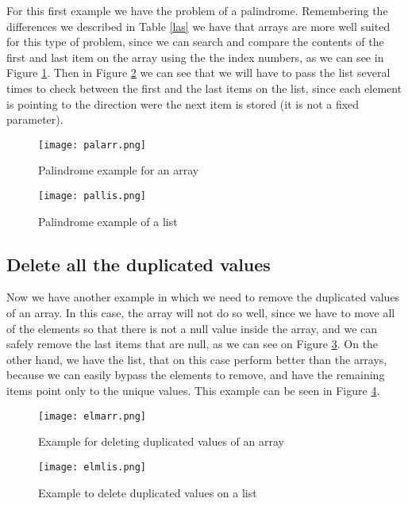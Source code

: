 \documentclass{article}
\begin{document}
For this first example we have the problem of a palindrome. Remembering the differences we described in Table \ref{las} we have that arrays are more well suited for this type of problem, since we can search and compare the contents of the first and last item on the array using the the index numbers, as we can see in Figure \ref{fig1}. Then in Figure \ref{fig2} we can see that we will have to pass the list several times to check between the first and the last items on the list, since each element is pointing to the direction were the next item is stored (it is not a fixed parameter).\\
\begin{figure}[htp]
	\centering
	\texttt{[image: palarr.png]}
\label{fig1}
	\caption{Palindrome example for an array}
\end{figure}

\begin{figure}[htp]
	\centering
	\texttt{[image: pallis.png]}
\label{fig2}
	\caption{Palindrome example of a list}
\end{figure}


\subsection{Delete all the duplicated values}

Now we have another example in which we need to remove the duplicated values of an array. In this case, the array will not do so well, since we have to move all of the elements so that there is not a null value inside the array, and we can safely remove the last items that are null, as we can see on Figure \ref{figura4}. On the other hand, we have the list, that on this case perform better than the arrays, because we can easily bypass the elements to remove, and have the remaining items point only to the unique values. This example can be seen in Figure \ref{fig5}.

\begin{figure}[htp]
	\centering
	\texttt{[image: elmarr.png]}
\label{figura4}
	\caption{Example for deleting duplicated values of an array}
\end{figure}

\begin{figure}[htp]
	\centering
	\texttt{[image: elmlis.png]}
\label{fig5}
	\caption{Example to delete duplicated values on a list}
\end{figure}
\end{document}
